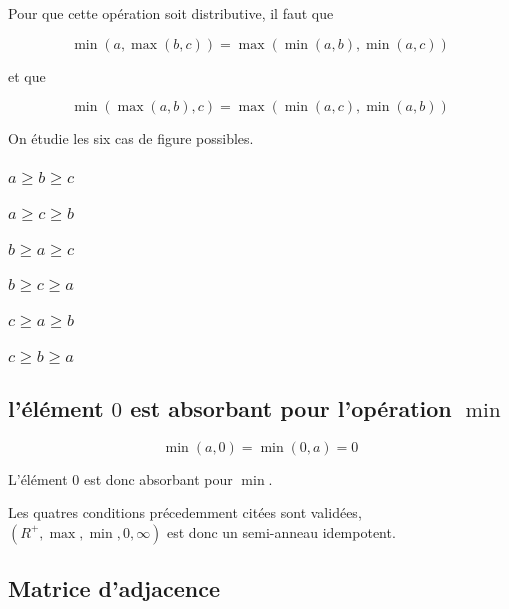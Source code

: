 \documentclass{article}
\begin{document}
Pour que cette opération soit distributive, il faut que

$$
\operatorname{min}(a, \operatorname{max}(b,c))
=
\operatorname{max}(\operatorname{min}(a,b),\operatorname{min}(a,c))
$$

et que

$$
\operatorname{min}(\operatorname{max}(a,b),c)
=
\operatorname{max}(\operatorname{min}(a,c),\operatorname{min}(a,b))
$$

On étudie les six cas de figure possibles.

\subsubsection{$a \geq b \geq c$}
\subsubsection{$a \geq c \geq b$}
\subsubsection{$b \geq a \geq c$}
\subsubsection{$b \geq c \geq a$}
\subsubsection{$c \geq a \geq b$}
\subsubsection{$c \geq b \geq a$}

\subsection{l'élément  $0$ est absorbant pour l'opération $\operatorname{min}$}

$$
\operatorname{min}(a,0) = \operatorname{min}(0,a) = 0
$$

L'élément $0$ est donc absorbant pour $\operatorname{min}$.

Les quatres conditions précedemment citées sont validées, $(R^+,
\operatorname{max}, \operatorname{min}, 0, \infty)$ est donc un
semi-anneau idempotent.

\subsection{Matrice d'adjacence}
\end{document}
